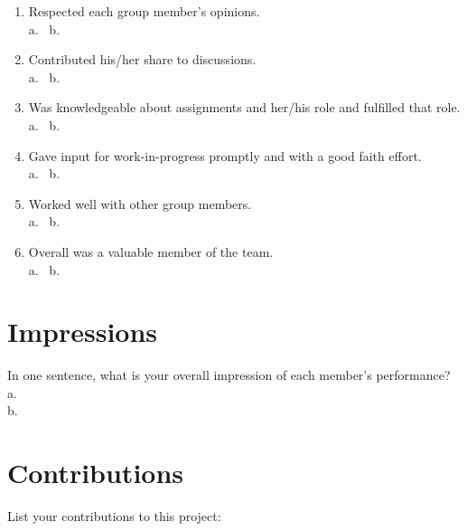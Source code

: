 \documentclass[10pt, letterpaper]{article}
\begin{document}
\begin{enumerate}
\item Respected each group member's opinions.\\[3ex]
      a. \underline{\hspace{2.35cm}}
      ~b. \underline{\hspace{2.35cm}}

\item Contributed his/her share to discussions.\\[3ex]
      a. \underline{\hspace{2.35cm}}
      ~b. \underline{\hspace{2.35cm}}

\item Was knowledgeable about assignments and her/his role and fulfilled that role.\\[3ex]
      a. \underline{\hspace{2.35cm}}
      ~b. \underline{\hspace{2.35cm}}

\item Gave input for work-in-progress promptly and with a good faith effort.\\[3ex]
      a. \underline{\hspace{2.35cm}}
      ~b. \underline{\hspace{2.35cm}}

\item Worked well with other group members.\\[3ex]
      a. \underline{\hspace{2.35cm}}
      ~b. \underline{\hspace{2.35cm}}

\item Overall was a valuable member of the team.\\[3ex]
      a. \underline{\hspace{2.35cm}}
      ~b. \underline{\hspace{2.35cm}}
\end{enumerate}

\section{Impressions}
In one sentence, what is your overall impression of each member's performance?\\[5ex]
a. \underline{\hspace{0.95\textwidth}}\\[5ex]
b. \underline{\hspace{0.95\textwidth}}\\[5ex]


\section{Contributions}
List your contributions to this project:
\end{document}
